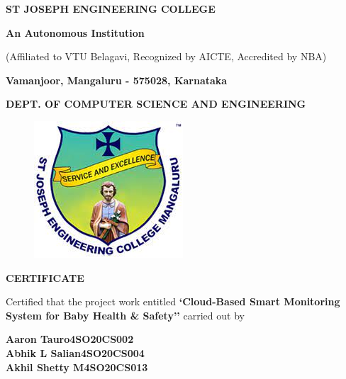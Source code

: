 \documentclass[12pt,a4paper]{report}
\begin{document}
\begin{center}
    \LARGE \textbf{ST JOSEPH ENGINEERING COLLEGE}
    \par
    \Large \textbf{An Autonomous Institution}
    \par \large{(Affiliated to VTU Belagavi, Recognized by AICTE, Accredited by NBA)}
    \par \vspace{3pt}
    \large \textbf{Vamanjoor, Mangaluru - 575028, Karnataka}
    \par \vspace{12pt}  
    \par
    \large \textbf{DEPT. OF COMPUTER SCIENCE AND ENGINEERING}
    \par
    \begin{figure}[hbtp]
    \centering
    \includegraphics[scale=0.5]{./pic/sjeclogo}
    \end{figure}
    
    
    {\Large \textbf{CERTIFICATE}}
    \end{center}
    \justifying
    \par
    \noindent 
    Certified that the project work entitled \textbf{`Cloud-Based Smart Monitoring System for Baby Health \& Safety''} carried out by\vspace{2pt} 
    \par
    \noindent 
    \vspace{2pt} 
    \textbf{\large \quad \quad \qquad Aaron Tauro}\qquad \qquad \qquad \qquad \textbf{\large 4SO20CS002}\\ \vspace{2pt} 
    \textbf{\large \quad \quad \qquad Abhik L Salian}\qquad \qquad \qquad \qquad \textbf{\large 4SO20CS004}\\ \vspace{2pt}
    \textbf{\large \quad \quad \qquad Akhil Shetty M}\qquad \qquad \qquad \qquad \textbf{\large 4SO20CS013}\\ \vspace{2pt}
\end{document}
